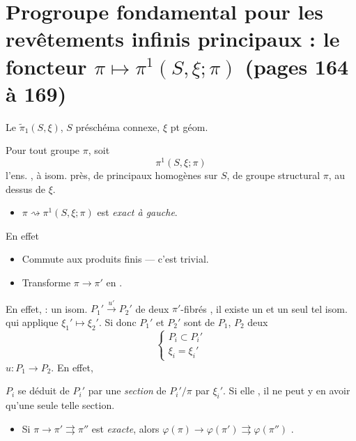 \documentclass[11pt,a4paper]{article}
\begin{document}
\section*{Progroupe fondamental pour les revêtements infinis principaux : le foncteur $\pi \mapsto \pi^1(S,\xi;\pi)$ (pages 164 à 169)}



Le $\widetilde{\pi}_1(S,\xi)$, $S$ préschéma connexe, $\xi$ pt géom.

Pour tout groupe $\pi$, soit
\[
  \pi^1(S,\xi;\pi)
\]
l'ens. \ill{}, à isom. près, de   principaux
homogènes sur $S$, de groupe structural $\pi$,  au dessus
de $\xi$.

\begin{itemize}
\item[$\alpha$)] $\pi \rightsquigarrow \pi^1(S,\xi;\pi)$ est \emph{exact à
gauche}.
\end{itemize}

En effet

\begin{itemize}
\item[a)] Commute aux produits finis --- c'est trivial.
\item[b)] Transforme  $\pi \to \pi'$ en
.
\end{itemize}

En effet, \ill{} : \ill{} \ill{} un isom.
$P_1' \xrightarrow{\ u'\ } P_2'$ de deux $\pi'$-fibrés \ill{}, il existe
\ill{} un et un seul tel isom. qui \ill{} applique
$\xi_1' \mapsto \xi_2'$. Si donc $P_1'$ et $P_2'$ sont  de
$P_1$, $P_2$ deux
\[
  \begin{cases} P_i \subset P_i' \\ \xi_i = \xi_i' \end{cases}
\]
\ill{}  \ill{} $u : P_1 \to P_2$. En effet,
\struck{\ill{}}


\struck{\ill{}} $P_i$ se déduit de $P_i'$ par une \emph{section} de
$P_i'/\pi$  par $\xi_i'$. Si elle , il ne
peut y en avoir qu'une seule telle section.

\begin{itemize}
\item[c)] Si $\pi \to \pi' \rightrightarrows \pi''$ est \emph{exacte}, alors
\struck{\ill{}} $\varphi(\pi) \to \varphi(\pi') \rightrightarrows
\varphi(\pi'')$ .
\end{itemize}
\end{document}
